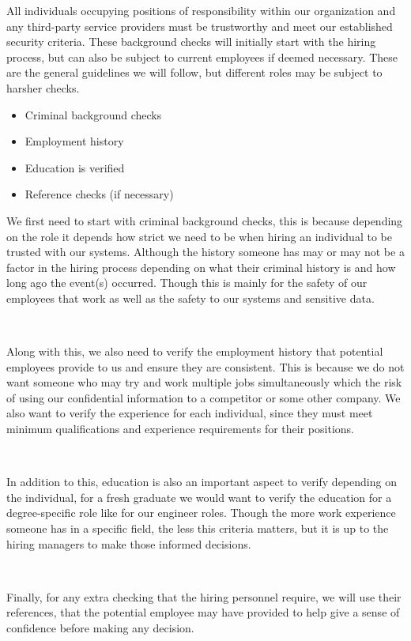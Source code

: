\documentclass[12pt,a4paper]{report}
\begin{document}
All individuals occupying positions of responsibility within our organization and any third-party service providers must be trustworthy and meet our established security criteria.
These background checks will initially start with the hiring process, but can also be subject to current employees if deemed necessary. 
These are the general guidelines we will follow, but different roles may be subject to harsher checks.
\begin{itemize}
 \item Criminal background checks
 \item Employment history
 \item Education is verified
 \item Reference checks (if necessary)
\end{itemize}

We first need to start with criminal background checks, this is because depending on the role it depends how strict we need to be when hiring an individual to be trusted with our systems.
Although the history someone has may or may not be a factor in the hiring process depending on what their criminal history is and how long ago the event(s) occurred.
Though this is mainly for the safety of our employees that work as well as the safety to our systems and sensitive data.

\

Along with this, we also need to verify the employment history that potential employees provide to us and ensure they are consistent. 
This is because we do not want someone who may try and work multiple jobs simultaneously which the risk of using our confidential information to a competitor or some other company.
We also want to verify the experience for each individual, since they must meet minimum qualifications and experience requirements for their positions.

\

In addition to this, education is also an important aspect to verify depending on the individual, for a fresh graduate we would want to verify the education for a degree-specific role like for our engineer roles.
Though the more work experience someone has in a specific field, the less this criteria matters, but it is up to the hiring managers to make those informed decisions.

\

Finally, for any extra checking that the hiring personnel require, we will use their references, that the potential employee may have provided to help give a sense of confidence before making any decision.
\end{document}
